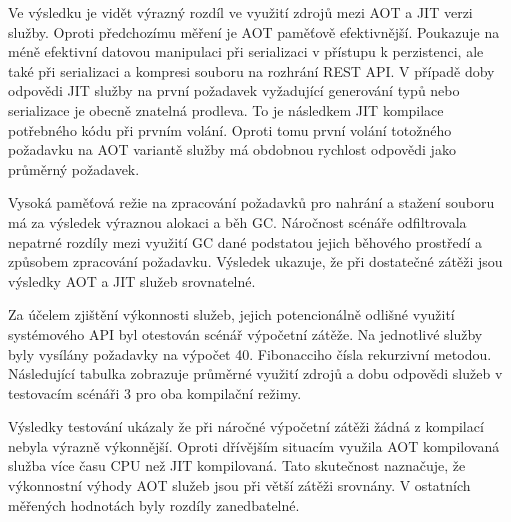 Ve výsledku je vidět výrazný rozdíl ve využití zdrojů mezi AOT a JIT verzi služby. Oproti předchozímu měření je AOT paměťově efektivnější. Poukazuje na méně efektivní datovou manipulaci při serializaci v přístupu k perzistenci, ale také při serializaci a kompresi souboru na rozhrání REST API. V případě doby odpovědi JIT služby na první požadavek vyžadující generování typů nebo serializace je obecně znatelná prodleva. To je následkem JIT kompilace potřebného kódu při prvním volání. Oproti tomu první volání totožného požadavku na AOT variantě služby má obdobnou rychlost odpovědi jako průměrný požadavek.


Vysoká paměťová režie na zpracování požadavků pro nahrání a stažení souboru má za výsledek výraznou alokaci a běh GC. Náročnost scénáře odfiltrovala nepatrné rozdíly mezi využití GC dané podstatou jejich běhového prostředí a způsobem zpracování požadavku. Výsledek ukazuje, že při dostatečné zátěži jsou výsledky AOT a JIT služeb srovnatelné.


Za účelem zjištění výkonnosti služeb, jejich potencionálně odlišné využití systémového API byl otestován scénář výpočetní zátěže. Na jednotlivé služby byly vysílány požadavky na výpočet 40. Fibonacciho čísla rekurzivní metodou. Následující tabulka zobrazuje průměrné využití zdrojů a dobu odpovědi služeb v testovacím scénáři 3 pro oba kompilační režimy.


Výsledky testování ukázaly že při náročné výpočetní zátěži žádná z kompilací nebyla výrazně výkonnější. Oproti dřívějším situacím využila AOT kompilovaná služba více času CPU než JIT kompilovaná. Tato skutečnost naznačuje, že výkonnostní výhody AOT služeb jsou při větší zátěži srovnány. V ostatních měřených hodnotách byly rozdíly zanedbatelné. 

